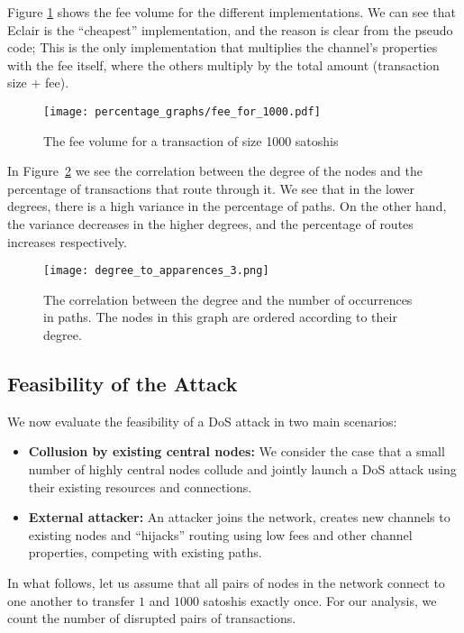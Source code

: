 Figure \ref{figure::fee_requested} shows the fee volume for the different implementations. We can see that Eclair is the ``cheapest'' implementation, and the reason is clear from the pseudo code; This is the only implementation that multiplies the channel's properties with the fee itself, where the others multiply by the total amount (transaction size + fee). 
    
\begin{figure} 
	\centering
	\texttt{[image: percentage\_graphs/fee\_for\_1000.pdf]}
	\caption{The fee volume for a transaction of size 1000 satoshis}
	\label{figure::fee_requested}
\end{figure}
    
In Figure~\ref{figure::degree_to_apparences} we see the correlation between the degree of the nodes and the percentage of transactions that route through it. We see that in the lower degrees, there is a high variance in the percentage of paths. On the other hand, the variance decreases in the higher degrees, and the percentage of routes increases respectively.
    
\begin{figure} 
	\centering
	\texttt{[image: degree\_to\_apparences\_3.png]}
	\caption{The correlation between the degree and the number of occurrences in paths. The nodes in this graph are ordered according to their degree.}
	\label{figure::degree_to_apparences}
\end{figure}

\subsection{Feasibility of the Attack} \label{sec::hijack_analysis}

We now evaluate the feasibility of a DoS attack in two main scenarios:

\begin{itemize}
    \item \textbf{Collusion by existing central nodes:} We consider the case that a small number of highly central nodes collude and jointly launch a DoS attack using their existing resources and connections.  
    \item \textbf{External attacker:} An attacker joins the network, creates new channels to existing nodes and ``hijacks'' routing using low fees and other channel properties, competing with existing paths.
\end{itemize}

In what follows, let us assume that all pairs of nodes in the network connect 
to one another to transfer $1$ and $1000$ satoshis exactly once. For our analysis,
we count the number of disrupted pairs of transactions.

